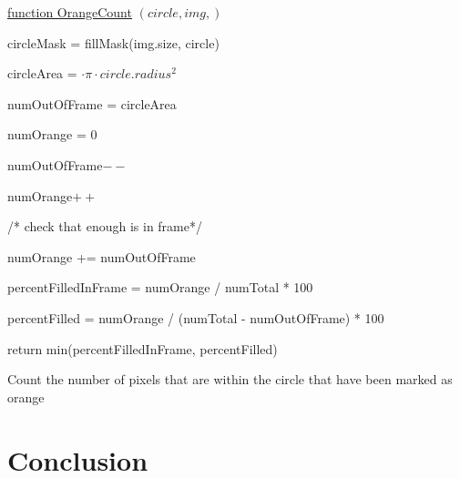 \documentclass[conference]{IEEEtran}
\begin{document}
\begin{algorithm} 

    \underline{function OrangeCount} $(circle, img,)$\;
    
        
    circleMask = fillMask(img.size, circle)
    
    circleArea = $  \cdot \pi \cdot circle.radius^2$
    
    numOutOfFrame = circleArea
   
    numOrange = 0
    
    
    {
	 {
	 	numOutOfFrame$--$
		
		{
			numOrange$++$
		}
	 }
    }
    
    /* check that enough is in frame*/
    
     {
	numOrange += numOutOfFrame
    }
    
    percentFilledInFrame = numOrange / numTotal * 100
    
    percentFilled = numOrange / (numTotal - numOutOfFrame) * 100
    
    return min(percentFilledInFrame, percentFilled)
    
    
    \caption{Count the number of pixels that are within the circle that have been marked as orange} \label{OrangeCountAlg}
\end{algorithm}


\section{Conclusion}









\vspace{12pt}
\end{document}
